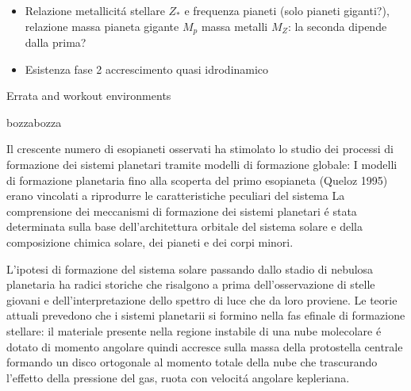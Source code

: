 \documentclass[twoside,11pt,fleqn]{memoir}%
\def\versione{bozza}%
\def\bozza{bozza}
\begin{document}
\begin{workout}
\begin{itemize}
\item Relazione metallicit\'a stellare $Z_*$ e frequenza pianeti (solo pianeti giganti?), relazione massa pianeta gigante $M_p$ massa metalli $M_Z$: la seconda dipende dalla prima?
\item Esistenza fase 2 accrescimento quasi idrodinamico 
\end{itemize}
\end{workout}
\tableofcontents*
\mainmatter
{}
\cleartorecto
\begin{workout}
Errata and workout environments
\end{workout}

\ifx\versione\bozza%
\woc
\fi

\begin{errata}
Il crescente numero di esopianeti osservati ha stimolato lo studio dei processi di formazione dei sistemi planetari tramite modelli di formazione globale: 
I modelli di formazione planetaria fino alla scoperta del primo esopianeta (Queloz 1995) erano vincolati a riprodurre le caratteristiche peculiari del sistema
La comprensione dei meccanismi di formazione dei sistemi planetari \'e stata determinata sulla base dell'architettura orbitale del sistema solare e della composizione chimica solare, dei pianeti e dei corpi minori.
\end{errata}

\begin{workout}
	L'ipotesi di formazione del sistema solare passando dallo stadio di nebulosa planetaria ha radici storiche che risalgono a prima dell'osservazione di stelle giovani e dell'interpretazione dello spettro di luce che da loro proviene.
	Le teorie attuali prevedono che i sistemi planetarii si formino nella fas efinale di formazione stellare: il materiale presente nella regione instabile di una nube molecolare \'e dotato di momento angolare quindi accresce sulla massa della protostella centrale formando un disco ortogonale al momento totale della nube che trascurando l'effetto della pressione del gas, ruota con velocit\'a angolare kepleriana.
\end{workout}
\end{document}
